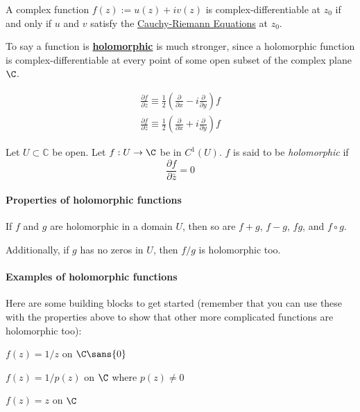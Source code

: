 \label{d1d5d93}

A complex function $f(z):=u(z)+iv(z)$ is complex-differentiable at $z_0$ if and
only if $u$ and $v$ satisfy the \href{fb10fd3}{Cauchy-Riemann Equations} at
$z_0$.

To say a function is \href{e1e08f7}{\textbf{holomorphic}} is much stronger,
since a holomorphic function is complex-differentiable at every point of some
open subset of the complex plane $\C$.

\label{ffea0ed}

\begin{gather*}
  \frac{\partial f}{\partial z}\equiv\frac12\left(\frac{\partial}{\partial x}-i\frac{\partial}{\partial y}\right)f \\[1em]
  \frac{\partial f}{\partial\bar z}\equiv\frac12\left(\frac{\partial}{\partial x}+i\frac{\partial}{\partial y}\right)f
\end{gather*}

\label{e1e08f7}

Let $U\subset\mathbb C$ be open. Let $f:U\to\C$ be in $C^1(U)$. $f$ is said to
be \textit{holomorphic} if
$$
  \frac{\partial f}{\partial\bar z}=0
$$

\paragraph{Properties of holomorphic functions} If $f$ and $g$ are holomorphic in a domain $U$, then so are $f+g$, $f-g$, $fg$,
and $f\circ g$.

Additionally, if $g$ has no zeros in $U$, then $f/g$ is holomorphic too.

\paragraph{Examples of holomorphic functions}

Here are some building blocks to get started (remember that you can use these
with the properties above to show that other more complicated functions are
holomorphic too):

\begin{enumerati}
  \item $f(z)=1/z$ on $\C\sans{0}$
  \item $f(z)=1/p(z)$ on $\C$ where $p(z)\neq0$
  \item $f(z)=z$ on $\C$
\end{enumerati}

